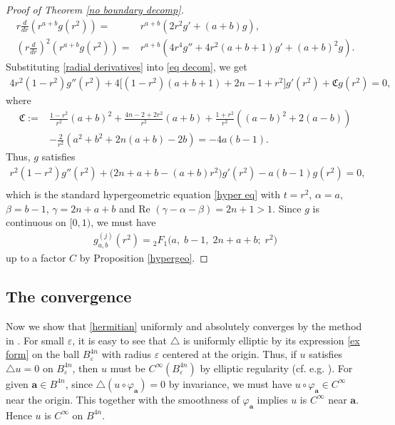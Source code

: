 \documentclass[a4paper,11pt]{amsart}
\numberwithin{equation}{section}
\begin{document}
\begin{proof}[Proof of Theorem \ref{no boundary decomp}]
\begin{equation}
\begin{aligned}
r\frac{d}{dr}\left(r^{a+b}g(r^2)\right)=& r^{a+b}\left(2r^2g' + (a+b)g\right),\\
\left(r\frac{d}{dr} \right)^2\left(r^{a+b}g(r^2)\right)=& r^{a+b}\left(4r^4g''+ 4r^2(a+b+1)g' +(a+b)^2 g\right).
\end{aligned}\end{equation}
Substituting \eqref{radial derivatives} into \eqref{eq decom}, we get
\begin{equation}\begin{aligned}\label{hyper eq}
4r^2(1-r^2)g''(r^2)+ 4\bigl[(1-r^2)(a+b +1) +2n-1+r^2\bigr]g'(r^2)+\mathfrak{C}g(r^2)=0,
\end{aligned}\end{equation}
where
\begin{equation*}\begin{aligned}
\mathfrak{C}:=&\frac{1-r^2}{r^2}(a+b)^2+ \frac{4n-2+2r^2}{r^2}(a+b)+\frac{1+r^2}{r^2}\left((a-b)^2+2(a-b)\right)\\
&-\frac{2}{r^2}\left(a^2+b^2+2n(a+b)-2b\right)=- 4a(b-1 ).
\end{aligned}\end{equation*}
Thus, $g$ satisfies
\begin{equation}\begin{aligned}\label{g eq}
r^2(1-r^2)g''(r^2)+ \bigl(2n+a+b-(a+b)r^2\bigr)g'(r^2)- a(b-1)g(r^2)=0,\\
\end{aligned}\end{equation}
which is the standard hypergeometric equation \eqref{hyper eq} with $t=r^2$, $\alpha=a$, $\beta=b-1$, $\gamma=2n+a+b$ and Re $(\gamma-\alpha-\beta)=2n+1>1$.
Since $g$ is continuous on $[0,1)$, we must have
\begin{equation*}\begin{aligned}
g^{(j)}_{a,b}(r^2) ={}_2F_1\bigl(a,\; b-1,\; 2n+a+b;\; r^2\bigr)
\end{aligned}\end{equation*}
up to a factor $C$ by Proposition \ref{hypergeo}.
\end{proof}
\subsection{The convergence}
 Now we show that \eqref{hermitian} uniformly and absolutely converges by the method in \cite{Stein}. For small $\varepsilon$, it is easy to see that $\triangle$ is uniformly elliptic by its expression \eqref{ex form} on the ball $B_{\varepsilon}^{4n}$ with radius $\varepsilon$ centered at the origin. Thus, if $u$ satisfies $\triangle u=0$ on $B^{4n}_{\varepsilon}$, then $u$ must be $C^{\infty}(B^{4n}_{\varepsilon})$ by elliptic regularity (cf. e.g. \cite[lemma 6.1]{Gilbrag}). For given $\mathbf{a}\in B^{4n}$, since $\triangle(u\circ \varphi_{\mathbf{a}})=0$ by invariance, we must have $u\circ \varphi_{\mathbf{a}}\in C^{\infty}$ near the origin. This together with the smoothness of $\varphi_{\mathbf{a}}$ implies $u$ is $C^{\infty}$ near $\mathbf{a}$. Hence $u$ is $C^{\infty}$ on $B^{4n}$.
\end{document}
